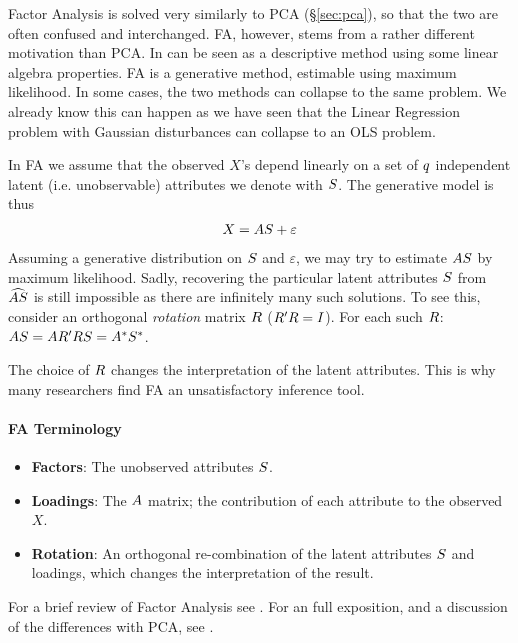 Factor Analysis is solved very similarly to PCA (\S\ref{sec:pca}), so that the two are often confused and interchanged. 
FA, however, stems from a rather different motivation than PCA.
In can be seen as a descriptive method using some linear algebra properties.
FA is a generative method, estimable using maximum likelihood. In some cases, the two methods can collapse to the same problem. 
We already know this can happen as we have seen that the Linear Regression problem with Gaussian disturbances can collapse to an OLS problem. 

In FA we assume that the observed $X$'s depend linearly on a set of $q$ independent latent (i.e. unobservable) attributes we denote with $S$.
The generative model is thus
\begin{align}
\label{eq:factor}
	X=A S+\varepsilon
\end{align}
Assuming a generative distribution on $S$ and $\varepsilon$, we may try to estimate $A S$ by maximum likelihood.
Sadly, recovering the particular latent attributes $S$ from $\widehat{AS}$ is still impossible as there are infinitely many such solutions. To see this, consider an orthogonal \emph{rotation} matrix $R$ ($R' R=I$). For each such $R$: $ A S=A R' R S = A^* S^*$.

The choice of $R$ changes the interpretation of the latent attributes. This is why many researchers find FA an unsatisfactory inference tool.


\paragraph{FA Terminology}
\begin{itemize}
\item \textbf{Factors}: The unobserved attributes $S$.
\item \textbf{Loadings}: The $A$ matrix; the contribution of each attribute to the observed $X$.
\item \textbf{Rotation}: An orthogonal re-combination of the latent attributes $S$ and loadings, which changes the interpretation of the result.
\end{itemize}


For a brief review of Factor Analysis see \cite{hastie_elements_2003}.
For an full exposition, and a discussion of the differences with PCA, see \cite{jolliffe_principal_2002}.





